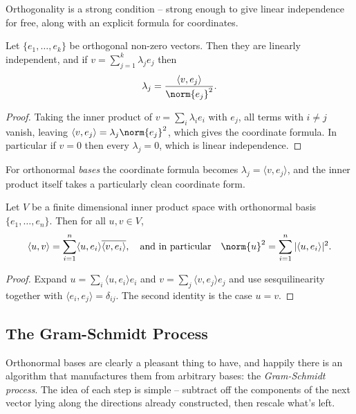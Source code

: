 Orthogonality is a strong condition -- strong enough to give linear independence for free, along with an explicit formula for coordinates.

\begin{lemma}
    Let $\{e_1, \dots, e_k\}$ be orthogonal non-zero vectors. Then they are linearly independent, and if $v = \sum_{j = 1}^k \lambda_j e_j$ then
    $$
    \lambda_j = \frac{\langle v, e_j \rangle}{\norm{e_j}^2}.
    $$
\end{lemma}
\begin{proof}
    Taking the inner product of $v = \sum_i \lambda_i e_i$ with $e_j$, all terms with $i \neq j$ vanish, leaving $\langle v, e_j \rangle = \lambda_j \norm{e_j}^2$, which gives the coordinate formula. In particular if $v = 0$ then every $\lambda_j = 0$, which is linear independence.
\end{proof}

For orthonormal \emph{bases} the coordinate formula becomes $\lambda_j = \langle v, e_j\rangle$, and the inner product itself takes a particularly clean coordinate form.

\begin{corollary}
    Let $V$ be a finite dimensional inner product space with orthonormal basis $\{e_1, \dots, e_n\}$. Then for all $u, v \in V$,
    $$
    \langle u, v \rangle = \sum_{i = 1}^n \langle u, e_i \rangle \overline{\langle v, e_i\rangle}, \quad \text{and in particular} \quad \norm{u}^2 = \sum_{i = 1}^n |\langle u, e_i \rangle|^2.
    $$
\end{corollary}
\begin{proof}
    Expand $u = \sum_i \langle u, e_i\rangle e_i$ and $v = \sum_j \langle v, e_j \rangle e_j$ and use sesquilinearity together with $\langle e_i, e_j \rangle = \delta_{ij}$. The second identity is the case $u = v$.
\end{proof}

\subsection{The Gram-Schmidt Process}

Orthonormal bases are clearly a pleasant thing to have, and happily there is an algorithm that manufactures them from arbitrary bases: the \emph{Gram-Schmidt process}. The idea of each step is simple -- subtract off the components of the next vector lying along the directions already constructed, then rescale what's left.

